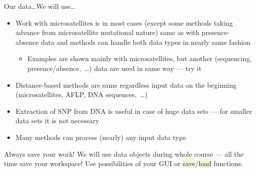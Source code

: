 \documentclass[compress, xelatex, 11pt, xcolor=svgnames, aspectratio=169,
	hyperref={
		bookmarks=true,
		unicode=true,
		colorlinks=true,
		pdftitle={Molecular data in R},
		plainpages=false,
		pdfauthor={Vojtech Zeisek},
		pdfsubject={Course about phylogeny and evolution in R},
		pdfcreator={XeLaTeX},
		pdfkeywords={R, evolution, phylogeny, molecular data},
		linkcolor=Crimson, %
		anchorcolor=Magenta, %
		citecolor=Magenta, %
		filecolor=Magenta, %
		menucolor=Magenta, %
		urlcolor=DodgerBlue, %
		},
	url={hyphens, lowtilde} %
	]{beamer}
\renewcommand{\texttt}[1]{\colorbox{Beige}{{\ttfamily #1}}}
\begin{document}
\begin{frame}[allowframebreaks]{Our data\ldots}{We will use\ldots}
\begin{itemize}
\begin{itemize}
				\item Morphological traits of Carnivora, \texttt{?ape::carnivora} --- life history patterns: allometric, phylogenetic and ecological associations
				\item Measurements of \textit{Iris setosa}, \textit{I. versicolor} and \textit{I. virginica}, \texttt{?iris} --- measurements of morphological characters, their correlations and differences among species
				\item Phylogeny and morphological traits of shorebirds, \texttt{?caper::shorebird} --- comparative evolution of characters
			\end{itemize}
		\item Work with microsatellites is in most cases (except some methods taking advance from microsatellite mutational nature) same as with presence-absence data and methods can handle both data types in nearly same fashion
		\begin{itemize}
			\item Examples are shown mainly with microsatellites, but another (sequencing, presence/absence,~\ldots) data are used in same way --- try it
		\end{itemize}
		\item Distance-based methods are same regardless input data on the beginning (microsatellites, AFLP, DNA sequences,~\ldots)
		\item Extraction of SNP from DNA is useful in case of huge data sets --- for smaller data sets it is not necessary
		\item Many methods can process (nearly) any input data type
	\end{itemize}
	\begin{alertblock}{Always save your work!}
		\alert{We will use data objects during whole course --- all the time save your workspace!} Use possibilities of your GUI or \texttt{save}/\texttt{load} functions.
	\end{alertblock}
\end{frame}
\end{document}
